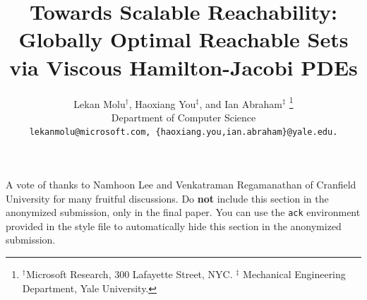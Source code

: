 \documentclass{article}
\title{Towards Scalable Reachability: Globally Optimal Reachable Sets via Viscous Hamilton-Jacobi PDEs}
\author{%
	Lekan Molu$^\dagger$, Haoxiang You$^\ddagger$, and Ian Abraham$^\ddagger$ %
	\thanks{$^\dagger$Microsoft Research,
	300 Lafayette Street, NYC. $^\ddagger$ Mechanical Engineering Department, Yale University.} \\
  Department of Computer Science\\
	\tt\small {lekanmolu@microsoft.com, \{haoxiang.you,ian.abraham\}@yale.edu}. \\%
}
\begin{document}
\maketitle


\thispagestyle{empty}
\pagestyle{empty}












\begin{ack}
A vote of thanks to Namhoon Lee and Venkatraman Regamanathan of Cranfield University for many fruitful discussions.
Do {\bf not} include this section in the anonymized submission, only in the final paper. You can use the \texttt{ack} environment provided in the style file to automatically hide this section in the anonymized submission.
\end{ack}

\medskip
{
\small


%
}



\appendix







\end{document}
